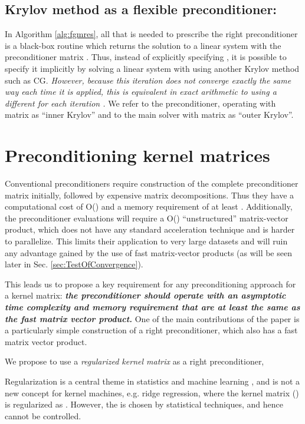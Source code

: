 \documentclass[10pt,journal,letterpaper,compsoc]{IEEEtran}
\begin{document}
\subsection{Krylov method as a flexible preconditioner:} In Algorithm \ref{alg:fgmres}, all that is needed to prescribe the right preconditioner is a black-box routine which returns the solution to a linear system with the preconditioner matrix . Thus, instead of explicitly specifying , it is possible to specify it implicitly by solving a linear system with  using another Krylov method such as CG. \emph{However, because this iteration does not converge exactly the same way each time it is applied, this is equivalent in exact arithmetic to using a different  for each iteration \cite{FlexibleKrylov}.} We refer to the preconditioner, operating with matrix  as ``inner Krylov'' and to the main solver with matrix  as ``outer Krylov''.

\section{Preconditioning kernel matrices \label{sec:ProposedPreconditioner}}
Conventional preconditioners require construction of the complete preconditioner matrix  initially, followed by expensive matrix decompositions. Thus they have a computational cost of O() and a memory requirement of at least . Additionally, the preconditioner evaluations will require a O() ``unstructured'' matrix-vector product, which does not have any standard acceleration technique and is harder to parallelize. This limits their application to very large datasets and will ruin any advantage gained by the use of fast matrix-vector products (as will be seen later in Sec. \ref{sec:TestOfConvergence}).

This leads us to propose a key requirement for any preconditioning approach for a kernel matrix: \emph{\textbf{the preconditioner should operate with an asymptotic time complexity and memory requirement that are at least the same as the fast matrix vector product.}} One of the main contributions of the paper is a particularly simple construction of a right preconditioner, which also has a fast matrix vector product.

We propose to use a \emph{regularized kernel matrix } as a right preconditioner,

Regularization is a central theme in statistics and machine learning \cite{VapnikStat}, and is not a new concept for kernel machines, e.g. ridge regression, where the kernel matrix () is regularized as . However, the  is chosen by statistical techniques, and hence cannot be controlled.
\end{document}
